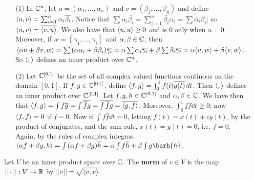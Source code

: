 \begin{example}
    \begin{enumerate}		
        \item[(1)] In $\mathbb{C}^n$, let $u=(\alpha_1, \dots, \alpha_n)$ and $v=(\beta_1, \dots, \beta_n)$ and
            define $\langle u,v\rangle=\sum_{i=1}^n{\alpha_i\overline{\beta_i}}$. Notice that 
            $\sum{\alpha_i\bar{\beta_i}}=\sum_{i=1}^n{\bar{\beta_i}\alpha_i}=\bar{\sum{\bar{\alpha_i}\beta_i}}$;
            so $\langle u,v\rangle=\overline{\langle v,u\rangle}$. We also have that $\langle u,u\rangle \geq 0$ and is
            $0$ only when  $u=0$. Moreover, if  $w=(\gamma_1, \dots, \gamma_i)$ and
            $\alpha,\beta \in \mathbb{C}$, then  $\langle \alpha u+\beta
            v,w\rangle=\sum{(\alpha\alpha_i+\beta\beta_i)\overline{\gamma_i}}=\alpha\sum{\alpha_i}\overline{\gamma_i}+
            \beta\sum{\beta_i}\overline{\gamma_i}=\alpha\langle u,w\rangle+\beta\langle v,w\rangle$. So
            $\langle ,\rangle$ defines an inner product over $\mathbb{C}^n$.

        \item[(2)] Let $\mathbb{C}^{[0,1]}$ be the set of all complex valued functions continous on the
            domain $[0,1]$. If $f,g \in \mathbb{C}^{[0,1]}$, define
            $\langle f,g\rangle=\int_{0}^1{f(t)\overline{g(t)}}\dd{t}$. Then $\langle ,\rangle$ defines an inner
            product over $\mathbb{C}^{[0,1]}$. Let $f,g,h \in \mathbb{C}^{[0,1]}$ and $\alpha,\beta \in \mathbb{C}$. We have
            then that
            $\langle f,g\rangle=\int{f\overline{g}}=\int{\overline{\overline{f}g}}=\overline{\int{\overline{f}g}}=\overline{\langle g,f\rangle}$.
        Moreover, $\int_{0}^1{f\bar{f}}\dd{t} \geq 0$; now  $\langle f,f\rangle=0$ if $f=0$. Now if
            $\int{f\bar{f} \dd{t}=0}$, letting  $f(t)=x(t)+iy(t)$, by the product of conjugates, and
            the sum rule, $x(t)=y(t)=0$, i.e. $f=0$. Again, by the rules of complex integras,
            $\vbrack{\alpha f+\beta g,h}=\int{(\alpha f+\beta
            g)\bar{h}}=\alpha\int{f\bar{h}}+\beta\int{g\barh{h}}$.
    \end{enumerate}
\end{example} 

\begin{definition}
    Let $V$ be an inner product space over  $\mathbb{C}$. The  \textbf{norm} of $v \in V$ is the map
    $||\cdot||:V \rightarrow \mathbb{R}$ by  $||v||=\sqrt{\langle v,v\rangle}$.
\end{definition}

